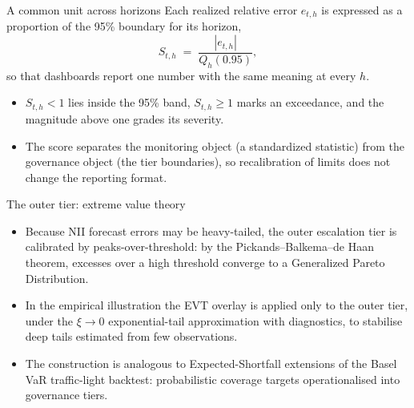 \documentclass[aspectratio=169,11pt]{beamer}
\begin{document}
\begin{frame}{A common unit across horizons}
  \small Each realized relative error $e_{t,h}$ is expressed as a proportion
  of the 95\% boundary for its horizon,
  \[ S_{t,h} \;=\; \frac{\left|e_{t,h}\right|}{Q_h(0.95)}, \]
  so that dashboards report one number with the same meaning at every $h$.
  \begin{itemize}
    \item $S_{t,h}<1$ lies inside the 95\% band, $S_{t,h}\ge 1$ marks an
          exceedance, and the magnitude above one grades its severity.
    \item The score separates the monitoring object (a standardized
          statistic) from the governance object (the tier boundaries), so
          recalibration of limits does not change the reporting format.
  \end{itemize}
\end{frame}

\begin{frame}{The outer tier: extreme value theory}
  \begin{itemize}
    \item Because NII forecast errors may be heavy-tailed, the outer
          escalation tier is calibrated by peaks-over-threshold: by the
          Pickands--Balkema--de Haan theorem, excesses over a high threshold
          converge to a Generalized Pareto Distribution.
    \item In the empirical illustration the EVT overlay is applied only to
          the outer tier, under the $\xi\to 0$ exponential-tail
          approximation with diagnostics, to stabilise deep tails estimated
          from few observations.
    \item The construction is analogous to Expected-Shortfall extensions of
          the Basel VaR traffic-light backtest: probabilistic coverage
          targets operationalised into governance tiers.
  \end{itemize}
\end{frame}
\end{document}
